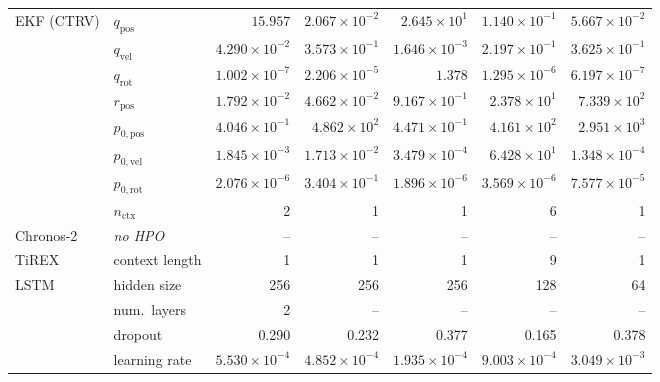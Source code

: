 \begin{table}[h]
\begin{tabular}{llrrrrr}
            EKF (CTRV)     & $q_\text{pos}$        & $15.957$               & $2.067 \times 10^{-2}$ & $2.645 \times 10^{1}$  & $1.140 \times 10^{-1}$ & $5.667 \times 10^{-2}$ \\
                           & $q_\text{vel}$        & $4.290 \times 10^{-2}$ & $3.573 \times 10^{-1}$ & $1.646 \times 10^{-3}$ & $2.197 \times 10^{-1}$ & $3.625 \times 10^{-1}$ \\
                           & $q_\text{rot}$        & $1.002 \times 10^{-7}$ & $2.206 \times 10^{-5}$ & $1.378$                & $1.295 \times 10^{-6}$ & $6.197 \times 10^{-7}$ \\
                           & $r_\text{pos}$        & $1.792 \times 10^{-2}$ & $4.662 \times 10^{-2}$ & $9.167 \times 10^{-1}$ & $2.378 \times 10^{1}$  & $7.339 \times 10^{2}$  \\
                           & $p_{0,\text{pos}}$    & $4.046 \times 10^{-1}$ & $4.862 \times 10^{2}$  & $4.471 \times 10^{-1}$ & $4.161 \times 10^{2}$  & $2.951 \times 10^{3}$  \\
                           & $p_{0,\text{vel}}$    & $1.845 \times 10^{-3}$ & $1.713 \times 10^{-2}$ & $3.479 \times 10^{-4}$ & $6.428 \times 10^{1}$  & $1.348 \times 10^{-4}$ \\
                           & $p_{0,\text{rot}}$    & $2.076 \times 10^{-6}$ & $3.404 \times 10^{-1}$ & $1.896 \times 10^{-6}$ & $3.569 \times 10^{-6}$ & $7.577 \times 10^{-5}$ \\
                           & $n_\text{ctx}$        & 2                      & 1                      & 1                      & 6                      & 1                      \\
            \midrule
            Chronos-2      & \textit{no HPO}        & --     & --     & --     & --     & --    \\
            TiREX          & context length        & 1     & 1     & 1     & 9     & 1     \\
            \midrule
            LSTM           & hidden size           & 256   & 256   & 256   & 128   & 64    \\
                           & num.\ layers          & 2     & --    & --    & --    & --    \\
                           & dropout               & 0.290 & 0.232 & 0.377 & 0.165 & 0.378 \\
                           & learning rate         & $5.530 \times 10^{-4}$ & $4.852 \times 10^{-4}$ & $1.935 \times 10^{-4}$ & $9.003 \times 10^{-4}$ & $3.049 \times 10^{-3}$ \\

\end{tabular}
\end{table}
